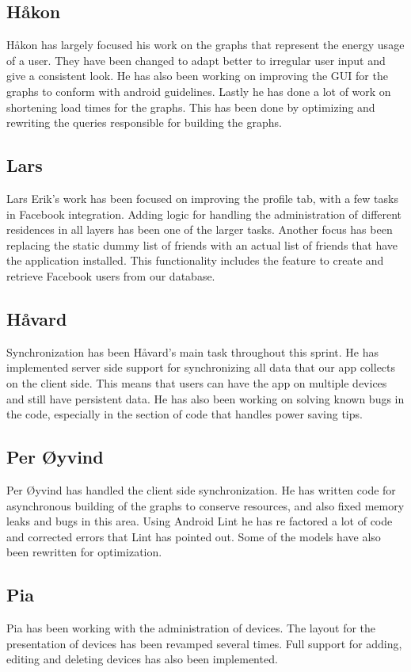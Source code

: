 \documentclass[12pt]{article}
\begin{document}
\subsection*{Håkon}
Håkon has largely focused his work on the graphs that represent the energy usage of a user. They have been changed to adapt better to irregular user input and give a consistent look. He has also been working on improving the GUI for the graphs to conform with android guidelines. Lastly he has done a lot of work on shortening load times for the graphs. This has been done by optimizing and rewriting the queries responsible for building the graphs.

\subsection*{Lars}
Lars Erik's work has been focused on improving the profile tab, with a few tasks in Facebook integration. Adding logic for handling the administration of different residences in all layers has been one of the larger tasks. Another focus has been replacing the static dummy list of friends with an actual list of friends that have the application installed. This functionality includes the feature to create and retrieve Facebook users from our database.

\subsection*{Håvard}
Synchronization has been Håvard's main task throughout this sprint. He has implemented server side support for synchronizing all data that our app collects on the client side. This means that users can have the app on multiple devices and still have persistent data. He has also been working on solving known bugs in the code, especially in the section of code that handles power saving tips.


\subsection*{Per Øyvind}
Per Øyvind has handled the client side synchronization. He has written code for asynchronous building of the graphs to conserve resources, and also fixed memory leaks and bugs in this area. Using Android Lint he has re factored a lot of code and corrected errors that Lint has pointed out. Some of the models have also been rewritten for optimization.

\subsection*{Pia}
Pia has been working with the administration of devices. The layout for the presentation of devices has been revamped several times. Full support for adding, editing and deleting devices has also been implemented.
\end{document}
